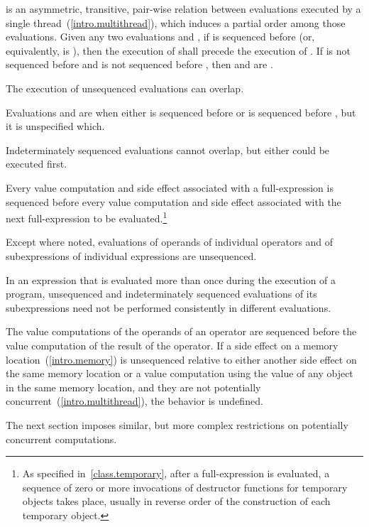 \pnum
{} is an asymmetric, transitive, pair-wise relation between
evaluations executed by a single thread~(\ref{intro.multithread}), which induces
a partial order among those evaluations. Given any two evaluations  and
, if  is sequenced before 
(or, equivalently,  is  ),
then the execution of
 shall precede the execution of . If  is not sequenced
before  and  is not sequenced before , then  and
 are . \begin{note} The execution of unsequenced
evaluations can overlap. \end{note} Evaluations  and  are
 when either  is sequenced before
 or  is sequenced before , but it is unspecified which.
\begin{note} Indeterminately sequenced evaluations cannot overlap, but either
could be executed first. \end{note}

\pnum
Every
%
value computation and
%
side effect associated with a full-expression is
sequenced before every value computation and side effect associated with the
next full-expression to be evaluated.\footnote{As specified
in~\ref{class.temporary}, after a full-expression is evaluated, a sequence of
zero or more invocations of destructor functions for temporary objects takes
place, usually in reverse order of the construction of each temporary object.}

\pnum
{}%
Except where noted, evaluations of operands of individual operators and
of subexpressions of individual expressions are unsequenced. \begin{note}
In an expression that is evaluated more than once during the execution
of a program, unsequenced and indeterminately sequenced evaluations of
its subexpressions need not be performed consistently in different
evaluations. \end{note} The value computations of the operands of an
operator are sequenced before the value computation of the result of the
operator. If a
%
side effect on a memory location~(\ref{intro.memory}) is unsequenced
relative to either another side effect on the same memory location or
a value computation using the value of any object in the same memory location,
and they are not potentially concurrent~(\ref{intro.multithread}),
the behavior is undefined.
\begin{note}
The next section imposes similar, but more complex restrictions on
potentially concurrent computations.
\end{note}


